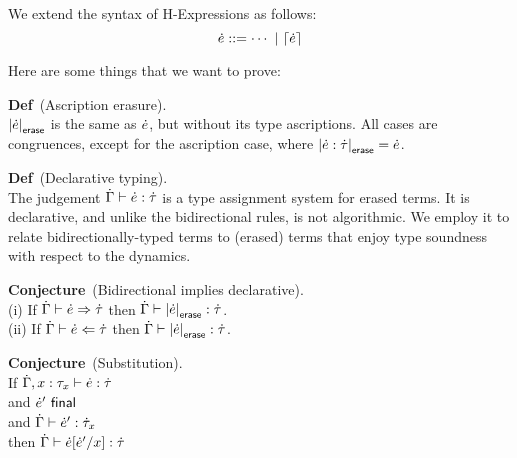 %
%
%

We extend the syntax of H-Expressions as follows:
\[
\dot{e} ::= \cdots~|~\lceil\dot{e}\rceil
\]

Here are some things that we want to prove:

\textbf{Def}~(Ascription erasure). 
\\
$\left|\dot{e}\right|_\textsf{erase}$ is the same as $\dot{e}$, but without its type ascriptions.
%
All cases are congruences, except for the ascription case, where $\left|\dot{e} : \dot{\tau}\right|_\textsf{erase} = \dot{e}$.

\textbf{Def}~(Declarative typing).
\\
The judgement $\dot{\Gamma} \vdash \dot{e} : \dot{\tau}$ is a type assignment
system for erased terms.  It is declarative, and unlike the
bidirectional rules, is not algorithmic.
%
We employ it to relate bidirectionally-typed terms to (erased) terms
that enjoy type soundness with respect to the dynamics.

\textbf{Conjecture}~(Bidirectional implies declarative).
\\
(i) If $\dot{\Gamma} \vdash \dot{e} \Rightarrow \dot{\tau}$ then $\dot{\Gamma} \vdash \left|\dot{e}\right|_\textsf{erase} : \dot{\tau}$.
\\
(ii) If $\dot{\Gamma} \vdash \dot{e} \Leftarrow \dot{\tau}$ then $\dot{\Gamma} \vdash \left|\dot{e}\right|_\textsf{erase} : \dot{\tau}$.

\textbf{Conjecture}~(Substitution).
\\
If $\dot{\Gamma}, x : \tau_x \vdash \dot{e} : \dot{\tau}$
\\
and $\dot{e}'~\textsf{final}$
\\
and $\dot{\Gamma} \vdash \dot{e}' : \dot{\tau}_x$
\\
then $\dot{\Gamma} \vdash \dot{e}[\dot{e}' / x] : \dot{\tau}$


